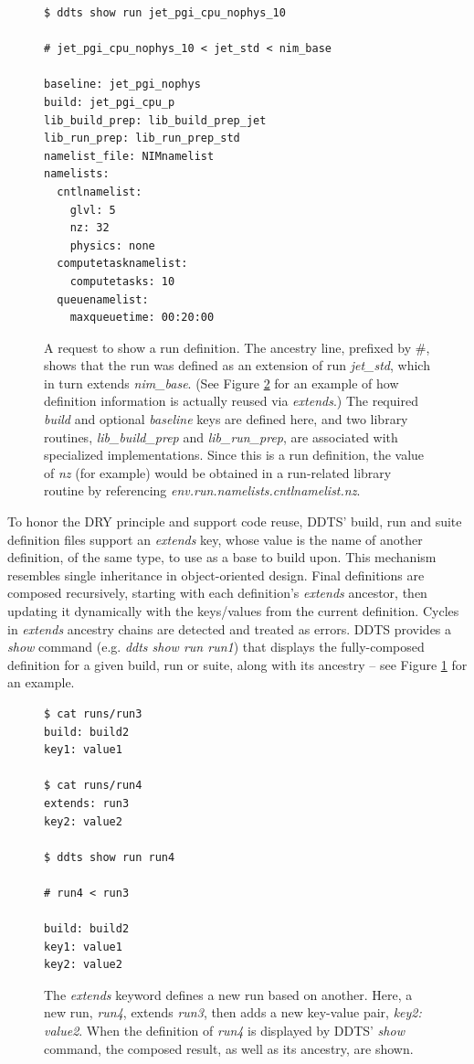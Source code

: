 \documentclass[conference]{IEEEtran}
\begin{document}
\begin{figure}[!t]
{\small \begin{verbatim}
$ ddts show run jet_pgi_cpu_nophys_10

# jet_pgi_cpu_nophys_10 < jet_std < nim_base

baseline: jet_pgi_nophys
build: jet_pgi_cpu_p
lib_build_prep: lib_build_prep_jet
lib_run_prep: lib_run_prep_std
namelist_file: NIMnamelist
namelists:
  cntlnamelist:
    glvl: 5
    nz: 32
    physics: none
  computetasknamelist:
    computetasks: 10
  queuenamelist:
    maxqueuetime: 00:20:00
\end{verbatim} }
\caption{A request to show a run definition. The ancestry line, prefixed by \#, shows that the run was defined as an extension of run \emph{jet\_std}, which in turn extends \emph{nim\_base}. (See Figure \ref{figure:4} for an example of how definition information is actually reused via \emph{extends}.) The required \emph{build} and optional \emph{baseline} keys are defined here, and two library routines, \emph{lib\_build\_prep} and \emph{lib\_run\_prep}, are associated with specialized implementations. Since this is a run definition, the value of \emph{nz} (for example) would be obtained in a run-related library routine by referencing \emph{env.run.namelists.cntlnamelist.nz}.}
\label{figure:3}
\end{figure}

To honor the DRY principle and support code reuse, DDTS' build, run and suite definition files support an \emph{extends} key, whose value is the name of another definition, of the same type, to use as a base to build upon. This mechanism resembles single inheritance in object-oriented design. Final definitions are composed recursively, starting with each definition's \emph{extends} ancestor, then updating it dynamically with the keys/values from the current definition. Cycles in \emph{extends} ancestry chains are detected and treated as errors. DDTS provides a \emph{show} command (e.g. \emph{ddts show run run1}) that displays the fully-composed definition for a given build, run or suite, along with its ancestry -- see Figure \ref{figure:3} for an example.

\begin{figure}[!t]
{\small \begin{verbatim}
$ cat runs/run3
build: build2
key1: value1

$ cat runs/run4
extends: run3
key2: value2

$ ddts show run run4

# run4 < run3

build: build2
key1: value1
key2: value2
\end{verbatim} }
\caption{The \emph{extends} keyword defines a new run based on another. Here, a new run, \emph{run4}, extends \emph{run3}, then adds a new key-value pair, \emph{key2: value2}. When the definition of \emph{run4} is displayed by DDTS' \emph{show} command, the composed result, as well as its ancestry, are shown.}
\label{figure:4}
\end{figure}
\end{document}
